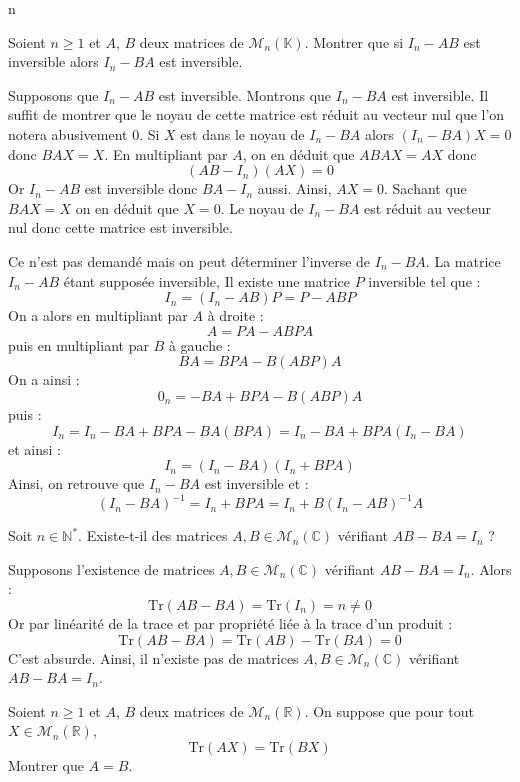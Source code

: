 n\documentclass[a4paper,10pt]{report}
\begin{document}
\begin{Exercice}{} Soient $n\geq 1$ et $A$, $B$ deux matrices de $\mathcal{M}_n(\mathbb{K})$. Montrer que si $I_n - AB$ est inversible alors $I_n - BA$ est inversible.
\end{Exercice} 

\corr Supposons que $I_n -AB$ est inversible. Montrons que $I_n-BA$ est inversible. Il suffit de montrer que le noyau de cette matrice est réduit au vecteur nul que l'on notera abusivement $0$. Si $X$ est dans le noyau de $I_n-BA$ alors $(I_n- BA)X=0$ donc $BAX=X$. En multipliant par $A$, on en déduit que $ABAX=AX$ donc 
$$ (AB-I_n)(AX)=0$$
Or $I_n -AB$ est inversible donc $BA-I_n$ aussi. Ainsi, $AX=0$. Sachant que $BAX=X$ on en déduit que $X=0$. Le noyau de $I_n-BA$ est réduit au vecteur nul donc cette matrice est inversible.

\medskip

\noindent Ce n'est pas demandé mais on peut déterminer l'inverse de $I_n-BA$. La matrice $I_n-AB$ étant supposée inversible, Il existe une matrice $P$ inversible tel que :
$$ I_n= (I_n-AB)P = P- ABP$$
On a alors en multipliant par $A$ à droite : 
$$ A = PA-ABPA$$
puis en multipliant par $B$ à gauche :
$$ BA = BPA- B(ABP)A$$
On a ainsi :
$$ 0_n = -BA + BPA- B(ABP)A$$
puis :
$$ I_n = I_n - BA +BPA - BA(BPA) = I_n - BA + BPA(I_n- BA)$$
et ainsi :
$$ I_n = (I_n-BA)(I_n+BPA)$$
Ainsi, on retrouve que $I_n-BA$ est inversible et :
$$ (I_n-BA)^{-1} = I_n+BPA = I_n+B(I_n-AB)^{-1}A$$


\begin{Exercice}{} Soit $n \in \mathbb{N}^*$. Existe-t-il des matrices $A,B \in \mathcal{M}_n(\mathbb{C})$ vérifiant $AB - BA = I_n$ ?
\end{Exercice}

\corr Supposons l'existence de matrices $A,B \in \mathcal{M}_n(\mathbb{C})$ vérifiant $AB - BA = I_n$. Alors :
$$ \textrm{Tr}(AB-BA) = \textrm{Tr}(I_n) = n \neq 0$$
Or par linéarité de la trace et par propriété liée à la trace d'un produit :
$$  \textrm{Tr}(AB-BA) =  \textrm{Tr}(AB)- \textrm{Tr}(BA) = 0$$
C'est absurde. Ainsi, il n'existe pas de matrices $A,B \in \mathcal{M}_n(\mathbb{C})$ vérifiant $AB - BA = I_n$.

\begin{Exercice}{} Soient $n \geq 1$ et $A$, $B$ deux matrices de $\mathcal{M}_n(\mathbb{R})$. On suppose que pour tout $X \in \mathcal{M}_n(\mathbb{R})$, 
$$\textrm{Tr}(AX)= \textrm{Tr}(BX)$$
Montrer que $A=B$.
\end{Exercice}
\end{document}
